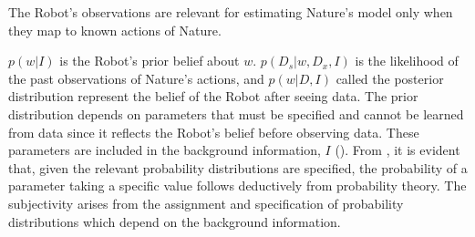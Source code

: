 \begin{axiom}
	\label{ax:observation_relevance}
	The Robot's observations are relevant for estimating Nature's model only when they map to known actions of Nature.
\end{axiom}

$p(w|I)$ is the Robot's prior belief about $w$. $p(D_s|w,D_x,I)$ is the likelihood of the past observations of Nature's actions, and $p(w|D,I)$ called the posterior distribution represent the belief of the Robot after seeing data. The prior distribution depends on parameters that must be specified and cannot be learned from data since it reflects the Robot's belief before observing data. These parameters are included in the background information, $I$ (). From , it is evident that, given the relevant probability distributions are specified, the probability of a parameter taking a specific value follows deductively from probability theory. The subjectivity arises from the assignment and specification of probability distributions which depend on the background information.


